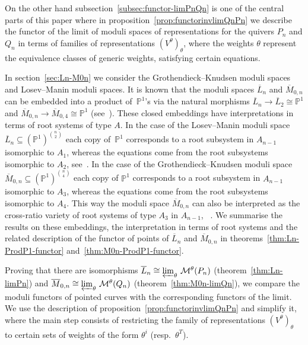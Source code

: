\documentclass[ALCO,ThmDefs,Unicode,epreuves]{cedram}
\def\P{\mathds P}
\begin{document}
On the other hand subsection~\ref{subsec:functor-limPnQn} is one of the central parts 
of this paper where in proposition~\ref{prop:functorinvlimQnPn} we describe the functor 
of the limit of moduli spaces of representations for the quivers $P_n$ and $Q_n$ 
in terms of families of representations $(V^\theta)_\theta$, where the weights $\theta$ 
represent the equivalence classes of generic weights, satisfying certain equations.


In section~\ref{sec:Ln-M0n} we consider the Grothendieck--Knudsen moduli spaces
and Losev--Manin moduli spaces.
It is known that the moduli spaces $\overline{L}_n$ and $\overline{M}_{0,n}$ 
can be embedded into a product of $\,\P^1$'s via the natural morphisms
$\overline{L}_n\to\overline{L}_2\cong\P^1$ and 
$\overline{M}_{0,n}\to\overline{M}_{0,4}\cong\P^1$ (see~\cite{BB11, GHP88}). 
These closed embeddings have interpretations in terms of root systems of type $A$.
In the case of the Losev--Manin moduli space $\overline{L}_n\subseteq(\P^1)^{\binom{n}{2}}$ 
each copy of $\,\P^1$ corresponds to a root subsystem in $A_{n-1}$ isomorphic 
to $A_1$, whereas the equations come from the root subsystems isomorphic 
to $A_2$, see~\cite{BB11}.
In the case of the Grothendieck--Knudsen moduli space 
$\overline{M}_{0,n}\subseteq(\P^1)^{\binom{n}{4}}$ each copy
of $\P^1$ corresponds to a root subsystem in $A_{n-1}$ isomorphic 
to $A_3$, whereas the equations come from the root subsystems isomorphic 
to $A_4$. This way the moduli space $\overline{M}_{0,n}$ can also be interpreted
as the cross-ratio variety of root systems of type $A_3$ in $A_{n-1}$,
\cf~\cite{Sek94, Sek96}.
We summarise the results on these embeddings, the interpretation in terms of root systems and the related description of the functor of points of 
$\overline{L}_n$ and $\overline{M}_{0,n}$ in theorems~\ref{thm:Ln-ProdP1-functor} 
and~\ref{thm:M0n-ProdP1-functor}.

Proving that there are isomorphisms 
$\overline{L}_n\cong\varprojlim_\theta\,\mathcal M^\theta(P_n)$
(theorem~\ref{thm:Ln-limPn}) and
$\overline{M}_{0,n}\cong\varprojlim_\theta\,\mathcal M^\theta(Q_n)$
(theorem~\ref{thm:M0n-limQn}), we compare the moduli functors of pointed curves
with the corresponding functors of the limit.
We use the description of proposition~\ref{prop:functorinvlimQnPn} and simplify it, 
where the main step consists of restricting the family of representations
$(V^\theta)_\theta$ to certain sets of weights of the form 
$\theta^i$ (resp.\ $\theta^T$).
\end{document}
